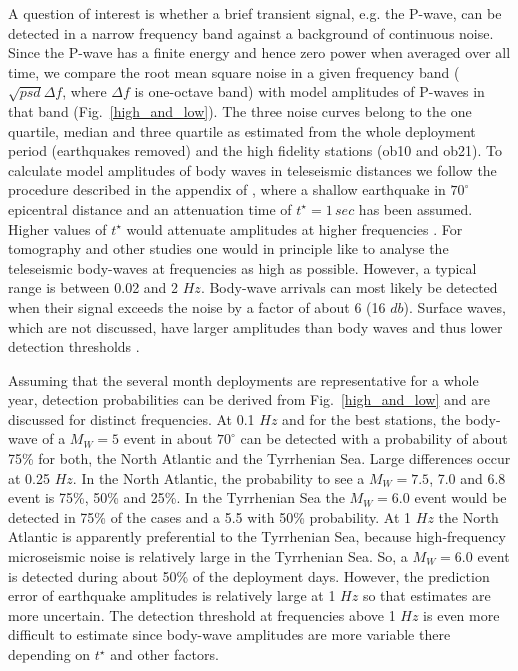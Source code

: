 \documentclass{article}
\begin{document}
{%
A question of interest is whether a brief transient signal, e.g. the P-wave, 
can be detected in a narrow frequency band against a background of continuous 
noise.
Since the P-wave has a finite energy and hence zero power when 
averaged over all time, 
we compare the root mean square noise in a given frequency band 
($\sqrt{psd} \Delta f$, where $\Delta f$ is one-octave band) 
with model amplitudes of P-waves in that band
(Fig.~\ref{high_and_low}).
The three noise curves belong to the one quartile, median and three 
quartile as estimated from the whole deployment period 
(earthquakes removed) and the high fidelity stations (ob10 and ob21).
To calculate model amplitudes of body waves in teleseismic distances we 
follow the procedure described in 
the appendix of \cite{webb:98}, where 
a shallow earthquake in $70^{\circ}$ epicentral distance and 
an attenuation time of $t^{\star} = 1\, sec$ has been assumed.
Higher values of
$t^{\star}$ would attenuate amplitudes at higher frequencies
\cite[see][for comparison and discussion]{webb:98}.
For tomography and other studies one would in principle 
like to analyse the teleseismic
body-waves at frequencies as high as possible.
However, a typical range is between 
0.02 and 2 $Hz$.
Body-wave arrivals can most likely be detected when 
their signal exceeds the noise by a factor of about 6 
(16 $db$).
Surface waves, which are not discussed, have larger 
amplitudes than body waves and thus lower detection thresholds
\cite[see also][]{webb:98}.

Assuming that the several month deployments are representative for a whole 
year, detection probabilities can be 
derived from Fig.~\ref{high_and_low} and are 
discussed for distinct frequencies. 
At 0.1 $Hz$ and for the best stations, 
the body-wave of a $M_W = 5$ event in about $70^{\circ}$ 
can be detected with a probability of about 75\% for both, the North Atlantic 
and the Tyrrhenian Sea.
Large differences occur at 0.25 $Hz$. 
In the North Atlantic, the probability to see a  
$M_W = 7.5$, 7.0 and 6.8  event is 75\%, 50\% and 25\%.
In the Tyrrhenian Sea the 
$M_W = 6.0$ event would be detected in 75\% of the cases
and a 5.5 with 50\% probability. 
At 1 $Hz$ the North Atlantic is apparently preferential to the Tyrrhenian 
Sea, because high-frequency microseismic noise is relatively large 
in the Tyrrhenian Sea.
So, a 
$M_W = 6.0$ event is detected during 
about 50\% of the deployment days.
However, the prediction error of earthquake amplitudes is relatively 
large at 1 $Hz$ so that estimates are more uncertain.
The detection threshold at frequencies above 1 $Hz$ is even 
more difficult to estimate since body-wave amplitudes are more variable there 
depending on $t^{\star}$ and other factors. 


}
\end{document}
